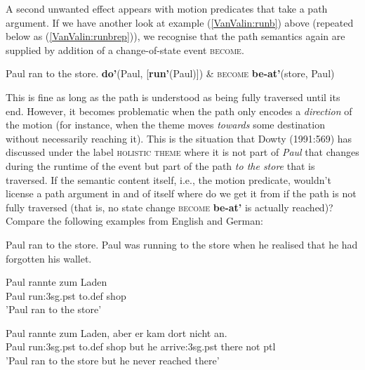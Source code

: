 A second unwanted effect appears with motion predicates that take a path argument. If we have another look at example (\ref{VanValin:runb}) above (repeated below as (\ref{VanValin:runbrep})), we recognise that the path semantics again are supplied by addition of a change-of-state event \textsc{become}. 

\ea \label{VanValin:runbrep}
\ea Paul ran to the store. 
\ex \textbf{do'}(Paul, [\textbf{run'}(Paul)]) \& \textsc{become} \textbf{be-at'}(store, Paul)
\z
\z

This is fine as long as the path is understood as being fully traversed until its end. However, it becomes problematic when the path only encodes a \emph{direction} of the motion (for instance, when the theme moves \textit{towards} some destination without necessarily reaching it). This is the situation that Dowty (1991:569) has discussed under the label \textsc{holistic theme} where it is not part of \textit{Paul} that changes during the runtime of the event but part of the path \textit{to the store} that is traversed. If the semantic content itself, i.e., the motion predicate, wouldn't license a path argument in and of itself where do we get it from if the path is not fully traversed (that is, no state change \textsc{become} \textbf{be-at'} is actually reached)?  Compare the following examples from English and German:

\ea
\ea Paul ran to the store.\label{runstorea}
\ex Paul was running to the store when he realised that he had forgotten his wallet.\label{runstoreb}
\z
\z

\ea \label{runstoreag}
\gll Paul rannte zum Laden\\
Paul run:\acs{3}\acs{sg}.\acs{pst} to.\acs{def} shop \\
\glft 'Paul ran to the store'\\
\z

\ea \label{runstorebg}
\gll Paul rannte zum Laden, aber er kam dort nicht an.\\
Paul run:\acs{3}\acs{sg}.\acs{pst} to.\acs{def} shop but he arrive:\acs{3}\acs{sg}.\acs{pst} there not \acs{ptl} \\
\glft 'Paul ran to the store but he never reached there'\\
\z

